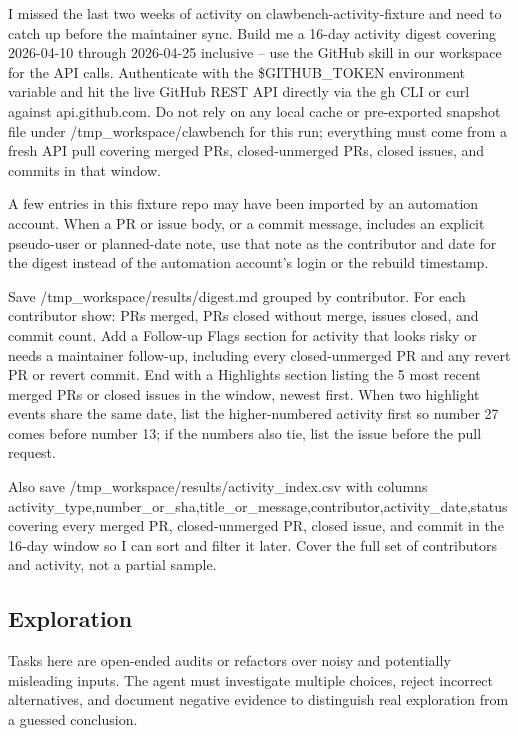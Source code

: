 \begin{clawcode}[title={\texttt{task\_19\_github\_activity\_digest}}]
I missed the last two weeks of activity on clawbench-activity-fixture
and need to catch up before the maintainer sync. Build me a 16-day
activity digest covering 2026-04-10 through 2026-04-25 inclusive --
use the GitHub skill in our workspace for the API calls. Authenticate
with the \$GITHUB_TOKEN environment variable and hit the live GitHub
REST API directly via the gh CLI or curl against api.github.com. Do
not rely on any local cache or pre-exported snapshot file under
/tmp_workspace/clawbench for this run; everything must come from a
fresh API pull covering merged PRs, closed-unmerged PRs, closed
issues, and commits in that window.

A few entries in this fixture repo may have been imported by an
automation account. When a PR or issue body, or a commit message,
includes an explicit pseudo-user or planned-date note, use that note
as the contributor and date for the digest instead of the automation
account's login or the rebuild timestamp.

Save /tmp_workspace/results/digest.md grouped by contributor. For
each contributor show: PRs merged, PRs closed without merge, issues
closed, and commit count. Add a Follow-up Flags section for activity
that looks risky or needs a maintainer follow-up, including every
closed-unmerged PR and any revert PR or revert commit. End with a
Highlights section listing the 5 most recent merged PRs or closed
issues in the window, newest first. When two highlight events share
the same date, list the higher-numbered activity first so number 27
comes before number 13; if the numbers also tie, list the issue
before the pull request.

Also save /tmp_workspace/results/activity_index.csv with columns
activity_type,number_or_sha,title_or_message,contributor,activity_date,status
covering every merged PR, closed-unmerged PR, closed issue, and
commit in the 16-day window so I can sort and filter it later. Cover
the full set of contributors and activity, not a partial sample.
\end{clawcode}

\subsection{Exploration}\label{app:examples:exploration}

Tasks here are open-ended audits or refactors over noisy and
potentially misleading inputs. The agent must investigate multiple
choices, reject incorrect alternatives, and document negative
evidence to distinguish real exploration from a guessed conclusion.

